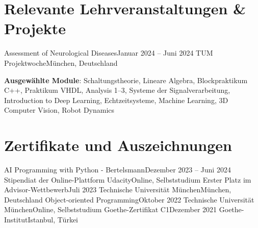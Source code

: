 \documentclass[a4paper,11pt]{article}
\begin{document}
\section{Relevante Lehrveranstaltungen \& Projekte}
\resumeSubHeadingListStart
\resumeSubheading
        {Assessment of Neurological Diseases}{Januar 2024 -- Juni 2024}
        {TUM Projektwoche}{München, Deutschland}
        \resumeItemListStart
        \small{}
        \resumeItemListEnd
        \vspace{0.05cm}
\item \small\textbf{Ausgewählte Module}: Schaltungstheorie, Lineare Algebra, Blockpraktikum C++, Praktikum VHDL, Analysis 1--3, Systeme der Signalverarbeitung, Introduction to Deep Learning, Echtzeitsysteme, Machine Learning, 3D Computer Vision, Robot Dynamics
\resumeSubHeadingListEnd


\section{Zertifikate und Auszeichnungen}
\resumeSubHeadingListStart
\resumeSubheading
        {AI Programming with Python - Bertelsmann}{Dezember 2023 -- Juni 2024}
        {Stipendiat der Online-Plattform Udacity}{Online, Selbststudium}\break
        \resumeItemListStart
         \small{}
        \resumeItemListEnd
        \vspace{0.1cm}
\resumeSubheading
        {Erster Platz im Advisor-Wettbewerb}{Juli 2023}
        {Technische Universität München}{München, Deutschland}\break
      \vspace{0.1cm}
\resumeSubheading
        {Object-oriented Programming}{Oktober 2022}
        {Technische Universität München}{Online, Selbststudium}
      \resumeItemListStart
        \small{}
    \resumeItemListEnd
\resumeSubheading
        {Goethe-Zertifikat C1}{Dezember 2021}
        {Goethe-Institut}{Istanbul, Türkei}
\resumeSubHeadingListEnd


\end{document}
